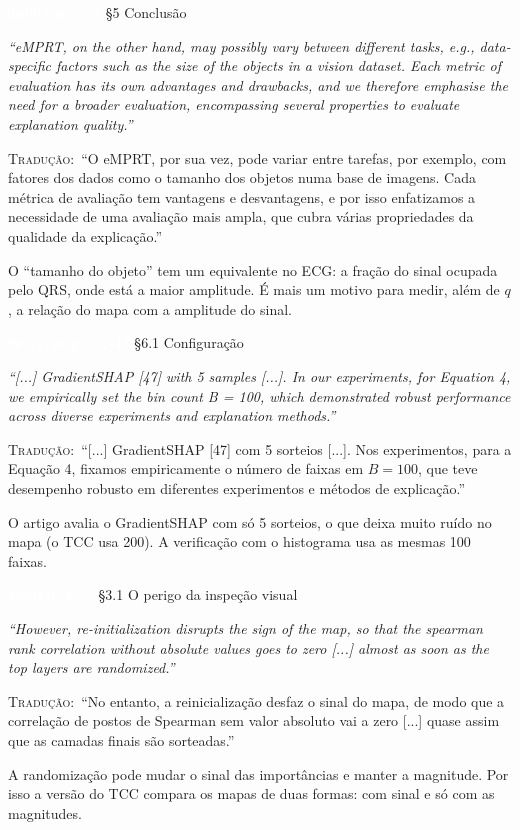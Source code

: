 \documentclass[11pt,a4paper]{article}
\newcommand{\pagechip}[1]{{\setlength{\fboxsep}{1.5pt}\colorbox{cAcc}{\textcolor{white}{\scriptsize\texttt{#1}}}}}
\newenvironment{origquote}{\par\itshape\small}{\par}
\newenvironment{tradquote}{\par\small\textsc{Tradução:}\ }{\par}
\newcommand{\explab}[1]{\par\smallskip{\small\color{cAcc}\textbf{\MakeUppercase{#1}}}\par}
\begin{document}
\begin{citacard}{\pagechip{Hedström p. 7} §5 Conclusão}
\begin{origquote}“eMPRT, on the other hand, may possibly vary between different tasks, e.g., data-specific factors such as the size of the objects in a vision dataset. Each metric of evaluation has its own advantages and drawbacks, and we therefore emphasise the need for a broader evaluation, encompassing several properties to evaluate explanation quality.”\end{origquote}
\begin{tradquote}“O eMPRT, por sua vez, pode variar entre tarefas, por exemplo, com fatores dos dados como o tamanho dos objetos numa base de imagens. Cada métrica de avaliação tem vantagens e desvantagens, e por isso enfatizamos a necessidade de uma avaliação mais ampla, que cubra várias propriedades da qualidade da explicação.”\end{tradquote}
\explab{Explicação}
O “tamanho do objeto” tem um equivalente no ECG: a fração do sinal ocupada pelo QRS, onde está a maior amplitude. É mais um motivo para medir, além de $q$, a relação do mapa com a amplitude do sinal.
\end{citacard}

\begin{citacard}{\pagechip{Hedström p. 12--13} §6.1 Configuração}
\begin{origquote}“[...] GradientSHAP [47] with 5 samples [...]. In our experiments, for Equation 4, we empirically set the bin count B = 100, which demonstrated robust performance across diverse experiments and explanation methods.”\end{origquote}
\begin{tradquote}“[...] GradientSHAP [47] com 5 sorteios [...]. Nos experimentos, para a Equação 4, fixamos empiricamente o número de faixas em $B = 100$, que teve desempenho robusto em diferentes experimentos e métodos de explicação.”\end{tradquote}
\explab{Explicação}
O artigo avalia o GradientSHAP com só 5 sorteios, o que deixa muito ruído no mapa (o TCC usa 200). A verificação com o histograma usa as mesmas 100 faixas.
\end{citacard}

\begin{citacard}{\pagechip{Adebayo p. 5} §3.1 O perigo da inspeção visual}
\begin{origquote}“However, re-initialization disrupts the sign of the map, so that the spearman rank correlation without absolute values goes to zero [...] almost as soon as the top layers are randomized.”\end{origquote}
\begin{tradquote}“No entanto, a reinicialização desfaz o sinal do mapa, de modo que a correlação de postos de Spearman sem valor absoluto vai a zero [...] quase assim que as camadas finais são sorteadas.”\end{tradquote}
\explab{Explicação}
A randomização pode mudar o sinal das importâncias e manter a magnitude. Por isso a versão do TCC compara os mapas de duas formas: com sinal e só com as magnitudes.
\end{citacard}
\end{document}
